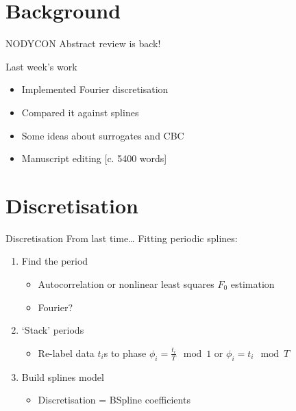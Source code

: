 \documentclass[presentation]{beamer}
\author{Mark Blyth}
\date{}
\title{}
\begin{document}
\section{Background}
\label{sec:org49754ec}
\begin{frame}[label={sec:org44496ef}]{NODYCON}
Abstract review is back!
\end{frame}

\begin{frame}[label={sec:orgc7c01ac}]{Last week's work}
\begin{itemize}
\item Implemented Fourier discretisation
\item Compared it against splines
\item Some ideas about surrogates and CBC
\item Manuscript editing \alert{[c. 5400 words]}
\end{itemize}
\end{frame}

\section{Discretisation}
\label{sec:org2d98ff9}
\begin{frame}[label={sec:org4a0ea12}]{Discretisation}
From last time\ldots{}
\vfill
Fitting periodic splines:
\begin{enumerate}[<+->]
\item Find the period
\begin{itemize}
\item Autocorrelation or nonlinear least squares \(F_0\) estimation
\item Fourier?
\end{itemize}
\item `Stack' periods
\begin{itemize}
\item Re-label data \(t_i\)s to phase \(\phi_i = \frac{t_i}{T} \mod 1\) or \(\phi_i = t_i \mod T\)
\end{itemize}
\item Build splines model
\begin{itemize}
\item Discretisation = BSpline coefficients
\end{itemize}
\end{enumerate}
\end{frame}
\end{document}

